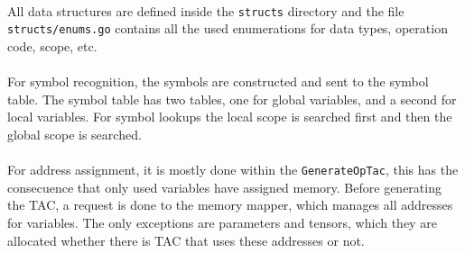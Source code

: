 \paragraph{} All data structures are defined inside the \texttt{structs}
directory and the file \texttt{structs/enums.go} contains all the used
enumerations for data types, operation code, scope, etc.

\paragraph{} For symbol recognition, the symbols are constructed and sent to
the symbol table. The symbol table has two tables, one for global variables, and
a second for local variables. For symbol lookups the local scope is searched
first and then the global scope is searched.

\paragraph{} For address assignment, it is mostly done within the
\texttt{GenerateOpTac}, this has the consecuence that only used variables have
assigned memory. Before generating the TAC, a request is done to the memory
mapper, which manages all addresses for variables. The only exceptions are
parameters and tensors, which they are allocated whether there is TAC that uses
these addresses or not.
